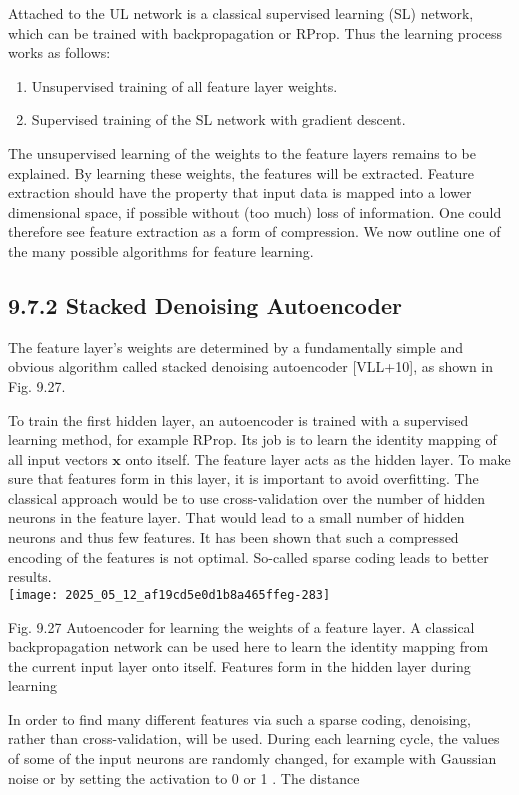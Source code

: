 \documentclass[10pt]{article}
\begin{document}
Attached to the UL network is a classical supervised learning (SL) network, which can be trained with backpropagation or RProp. Thus the learning process works as follows:

\begin{enumerate}
  \item Unsupervised training of all feature layer weights.
  \item Supervised training of the SL network with gradient descent.
\end{enumerate}

The unsupervised learning of the weights to the feature layers remains to be explained. By learning these weights, the features will be extracted. Feature extraction should have the property that input data is mapped into a lower dimensional space, if possible without (too much) loss of information. One could therefore see feature extraction as a form of compression. We now outline one of the many possible algorithms for feature learning.

\subsection*{9.7.2 Stacked Denoising Autoencoder}
The feature layer's weights are determined by a fundamentally simple and obvious algorithm called stacked denoising autoencoder [VLL+10], as shown in Fig. 9.27.

To train the first hidden layer, an autoencoder is trained with a supervised learning method, for example RProp. Its job is to learn the identity mapping of all input vectors $\boldsymbol{x}$ onto itself. The feature layer acts as the hidden layer. To make sure that features form in this layer, it is important to avoid overfitting. The classical approach would be to use cross-validation over the number of hidden neurons in the feature layer. That would lead to a small number of hidden neurons and thus few features. It has been shown that such a compressed encoding of the features is not optimal. So-called sparse coding leads to better results.\\
\texttt{[image: 2025\_05\_12\_af19cd5e0d1b8a465ffeg-283]}

Fig. 9.27 Autoencoder for learning the weights of a feature layer. A classical backpropagation network can be used here to learn the identity mapping from the current input layer onto itself. Features form in the hidden layer during learning

In order to find many different features via such a sparse coding, denoising, rather than cross-validation, will be used. During each learning cycle, the values of some of the input neurons are randomly changed, for example with Gaussian noise or by setting the activation to 0 or 1 . The distance
\end{document}
